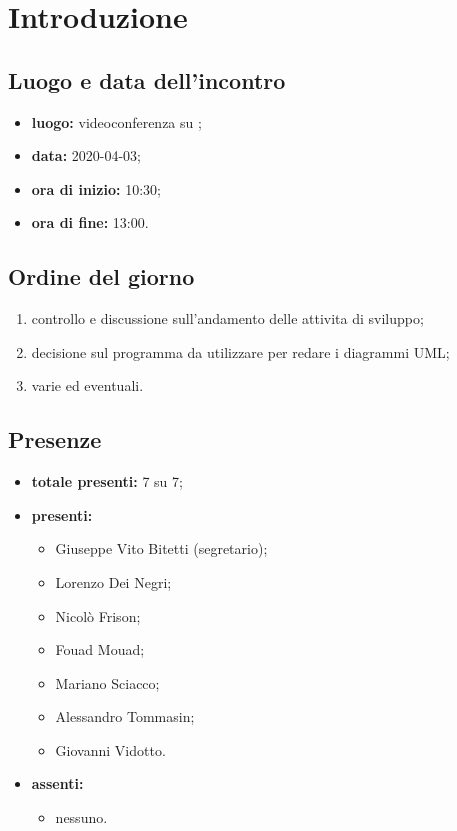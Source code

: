 \section*{Introduzione}

\subsection*{Luogo e data dell'incontro}
	\begin{itemize}
		\item \textbf{luogo:} videoconferenza su ;
		\item \textbf{data:} 2020-04-03;
		\item \textbf{ora di inizio:} 10:30;
		\item \textbf{ora di fine:} 13:00.
	\end{itemize}

\subsection*{Ordine del giorno}
	\begin{enumerate}
			\item controllo e discussione sull'andamento delle attivita di sviluppo;
			\item decisione sul programma da utilizzare per redare i diagrammi UML;
			\item varie ed eventuali.
	\end{enumerate}

\subsection*{Presenze}
	\begin{itemize}
		\item \textbf{totale presenti:} 7 su 7;
		\item \textbf{presenti: }
			\begin{itemize}
				\item Giuseppe Vito Bitetti (segretario);
				\item Lorenzo Dei Negri;
				\item Nicolò Frison;
				\item Fouad Mouad;
				\item Mariano Sciacco;
				\item Alessandro Tommasin;
				\item Giovanni Vidotto.
			\end{itemize}
		\item \textbf{assenti: }
			\begin{itemize}
				\item nessuno.
			\end{itemize}
	\end{itemize}


